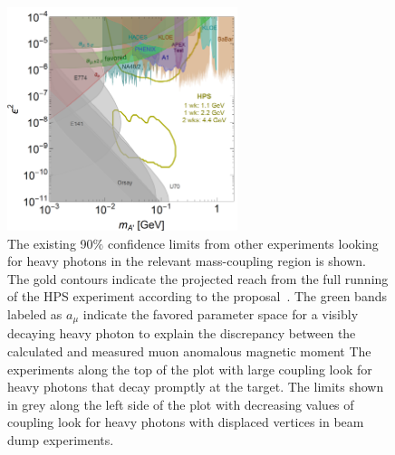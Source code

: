 \begin{figure}[H]
  \centering
      \includegraphics[width=0.6\textwidth]{pics/intro/projectedReach.png}
  \caption[Projected reach for the HPS experiment]{The existing 90$\%$ confidence limits from other experiments looking for heavy photons in the relevant mass-coupling region is shown. The gold contours indicate the projected reach from the full running of the HPS experiment according to the proposal~\cite{collaboration_heavy_2013}. The green bands labeled as $a_\mu$ indicate the favored parameter space for a visibly decaying heavy photon to explain the discrepancy between the calculated and measured muon anomalous magnetic moment The experiments along the top of the plot with large coupling look for heavy photons that decay promptly at the target. The limits shown in grey along the left side of the plot with decreasing values of coupling look for heavy photons with displaced vertices in beam dump experiments.}
  \label{Figure:projReach}
\end{figure}

